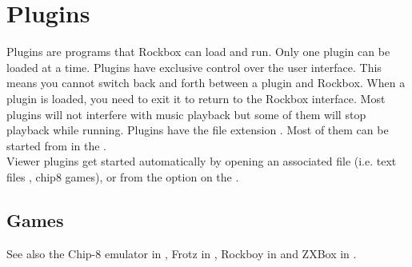 \chapter{Plugins}\label{ref:plugins}
Plugins are programs that Rockbox can load and run. Only one plugin can
be loaded at a time. Plugins have exclusive control over the user interface.
This means you cannot switch back and forth between a plugin and Rockbox. When
a plugin is loaded, you need to exit it to return to the Rockbox interface.
Most plugins will not interfere with music playback but some of them will stop
playback while running. Plugins have the file extension . Most of
them can be started from  in the .\\

Viewer plugins get started automatically by opening an associated file (i.e.
text files%
, chip8 games), or from the  option on the .

\section{Games}
  See also the Chip{}-8 emulator in ,
  Frotz in ,
  {Rockboy in }
  and ZXBox in .





















